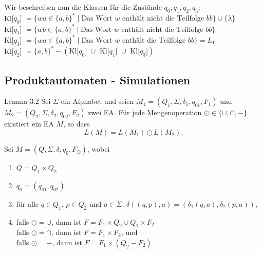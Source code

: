 \documentclass[a4paper, 11pt]{article}
\begin{document}

    Wir beschreiben nun die Klassen für die Zustände $q_0, q_1, q_2, q_3$:
    \\Kl[$q_0$] $= \{wa \in \{a,b\}^* \mid \text{Das Wort }w \text{ enthält nicht die Teilfolge } bb\} \cup \{\lambda\}$
    \\Kl[$q_1$] $= \{wb \in \{a,b\}^* \mid \text{Das Wort } w \text{ enthält nicht die Teilfolge } bb\}$
    \\Kl[$q_3$] $= \{wa \in \{a,b\}^* \mid \text{Das Wort } w \text{ enthält die Teilfolge } bb\} = L_1$
    \\Kl[$q_2$] $= \{a,b\}^* - (\text{Kl[$q_0$] $\cup $ Kl[$q_1$] $\cup $ Kl[$q_3$]})$



    \subsection{Produktautomaten - Simulationen}
    \begin{mainbox}{Lemma 3.2}
        Sei $\Sigma$ ein Alphabet und seien $M_1 = (Q_1, \Sigma, \delta_1, q_{01}, F_1)$ und $M_2 = (Q_2, \Sigma, \delta_2, q_{02}, F_2)$ zwei EA. Für jede Mengenoperation $\odot \in \{\cup, \cap, -\}$ existiert ein EA $M$, so dass
        $$L(M) = L(M_1) \odot L(M_2).$$
    \end{mainbox}
    Sei $M = (Q, \Sigma, \delta, q_0, F_{\odot})$, wobei
    \begin{enumerate}[label=(\roman*)]
        \item $Q = Q_1 \times Q_2$
        \item $q_0 = (q_{01}, q_{02})$
        \item für alle $q \in Q_1$, $p \in Q_2$ und $a \in \Sigma$, $\delta((q,p), a) = (\delta_1(q,a), \delta_2(p, a))$,
        \item falls $\odot = \cup$, dann ist $F = F_1 \times Q_2 \cup Q_1 \times F_2$\\
        falls $\odot = \cap$, dann ist $F = F_1 \times F_2$, und\\
        falls $\odot = -$, dann ist $F = F_1 \times (Q_2 - F_2)$.
    \end{enumerate}
\end{document}
